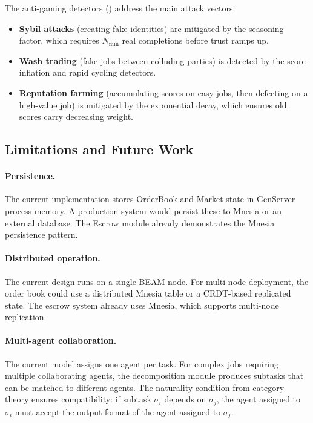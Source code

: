 \documentclass[12pt,a4paper]{article}
\theoremstyle{plain}
\theoremstyle{definition}
\begin{document}
The anti-gaming detectors () address the main attack vectors:
\begin{itemize}
    \item \textbf{Sybil attacks} (creating fake identities) are mitigated by the seasoning factor, which requires $N_{\min}$ real completions before trust ramps up.
    \item \textbf{Wash trading} (fake jobs between colluding parties) is detected by the score inflation and rapid cycling detectors.
    \item \textbf{Reputation farming} (accumulating scores on easy jobs, then defecting on a high-value job) is mitigated by the exponential decay, which ensures old scores carry decreasing weight.
\end{itemize}

\subsection{Limitations and Future Work}

\paragraph{Persistence.} The current implementation stores OrderBook and Market state in GenServer process memory. A production system would persist these to Mnesia or an external database. The Escrow module already demonstrates the Mnesia persistence pattern.

\paragraph{Distributed operation.} The current design runs on a single BEAM node. For multi-node deployment, the order book could use a distributed Mnesia table or a CRDT-based replicated state. The escrow system already uses Mnesia, which supports multi-node replication.

\paragraph{Multi-agent collaboration.} The current model assigns one agent per task. For complex jobs requiring multiple collaborating agents, the decomposition module produces subtasks that can be matched to different agents. The naturality condition from category theory ensures compatibility: if subtask $\sigma_i$ depends on $\sigma_j$, the agent assigned to $\sigma_i$ must accept the output format of the agent assigned to $\sigma_j$.
\end{document}
